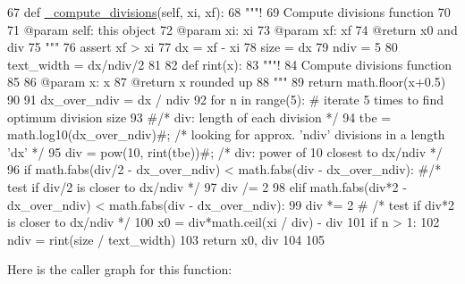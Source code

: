 \begin{DoxyCode}
67     \textcolor{keyword}{def }\hyperlink{classvisualizer_1_1hud_1_1Axes_a0356e26f0e4554399fd97ac81ad4451d}{\_compute\_divisions}(self, xi, xf):
68         \textcolor{stringliteral}{"""!}
69 \textcolor{stringliteral}{        Compute divisions function}
70 \textcolor{stringliteral}{        }
71 \textcolor{stringliteral}{        @param self: this object}
72 \textcolor{stringliteral}{        @param xi: xi}
73 \textcolor{stringliteral}{        @param xf: xf}
74 \textcolor{stringliteral}{        @return x0 and div}
75 \textcolor{stringliteral}{        """}
76         \textcolor{keyword}{assert} xf > xi
77         dx = xf - xi
78         size = dx
79         ndiv = 5
80         text\_width = dx/ndiv/2
81 
82         \textcolor{keyword}{def }rint(x):
83             \textcolor{stringliteral}{"""!}
84 \textcolor{stringliteral}{            Compute divisions function}
85 \textcolor{stringliteral}{        }
86 \textcolor{stringliteral}{            @param x: x}
87 \textcolor{stringliteral}{            @return x rounded up}
88 \textcolor{stringliteral}{            """}
89             \textcolor{keywordflow}{return} math.floor(x+0.5)
90         
91         dx\_over\_ndiv = dx / ndiv
92         \textcolor{keywordflow}{for} n \textcolor{keywordflow}{in} range(5): \textcolor{comment}{# iterate 5 times to find optimum division size}
93             \textcolor{comment}{#/* div: length of each division */}
94             tbe = math.log10(dx\_over\_ndiv)\textcolor{comment}{#;   /* looking for approx. 'ndiv' divisions in a length 'dx' */}
95             div = pow(10, rint(tbe))\textcolor{comment}{#;  /* div: power of 10 closest to dx/ndiv */}
96             \textcolor{keywordflow}{if} math.fabs(div/2 - dx\_over\_ndiv) < math.fabs(div - dx\_over\_ndiv): \textcolor{comment}{#/* test if div/2 is closer
       to dx/ndiv */}
97                 div /= 2
98             \textcolor{keywordflow}{elif} math.fabs(div*2 - dx\_over\_ndiv) < math.fabs(div - dx\_over\_ndiv):
99                 div *= 2 \textcolor{comment}{#                      /* test if div*2 is closer to dx/ndiv */}
100             x0 = div*math.ceil(xi / div) - div
101             \textcolor{keywordflow}{if} n > 1:
102                 ndiv = rint(size / text\_width)
103         \textcolor{keywordflow}{return} x0, div
104         
105         
\end{DoxyCode}


Here is the caller graph for this function\+:


